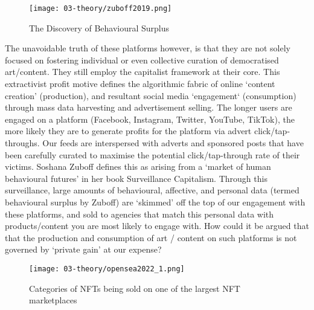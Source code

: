 \begin{figure}[ht]
    \centering
    \texttt{[image: 03-theory/zuboff2019.png]}
    \captionsetup{justification=centering,margin=1.5cm}
    \caption{The Discovery of Behavioural Surplus \citep[in][]{zuboff2019}}\label{fig: zuboff2019}
\end{figure}

The unavoidable truth of these platforms however, is that they are not solely focused on fostering individual or even collective curation of democratised art/content. They still employ the capitalist framework at their core. This extractivist profit motive defines the algorithmic fabric of online `content creation' (production), and resultant social media `engagement` (consumption) through mass data harvesting and advertisement selling. The longer users are engaged on a platform (Facebook, Instagram, Twitter, YouTube, TikTok), the more likely they are to generate profits for the platform via advert click/tap-throughs. Our feeds are interspersed with adverts and sponsored posts that have been carefully curated to maximise the potential click/tap-through rate of their victims. Soshana Zuboff defines this as arising from a `market of human behavioural futures' \citeyearpar{zuboff2019} in her book Surveillance Capitalism. Through this surveillance, large amounts of behavioural, affective, and personal data (termed behavioural surplus by Zuboff) are `skimmed' off the top of our engagement with these platforms, and sold to agencies that match this personal data with products/content you are most likely to engage with. How could it be argued that that the production and consumption of art / content on such platforms is not governed by `private gain' at our expense? 

\begin{figure}[ht]
    \centering
    \texttt{[image: 03-theory/opensea2022\_1.png]}
    \captionsetup{justification=centering,margin=1.5cm}
    \caption{Categories of NFTs being sold on one of the largest NFT marketplaces \citep[from][]{opensea2022a}}\label{fig: opensea2022_1}
\end{figure}

